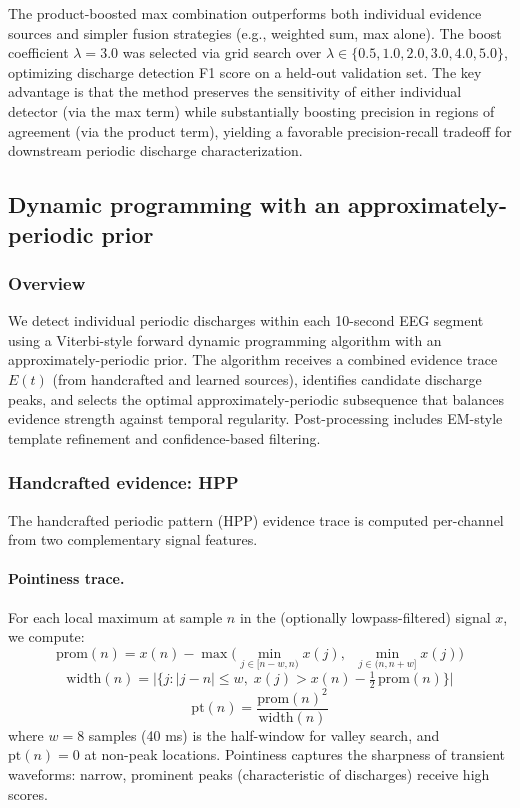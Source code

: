 The product-boosted max combination outperforms both individual evidence sources and simpler fusion strategies (e.g., weighted sum, max alone). The boost coefficient $\lambda = 3.0$ was selected via grid search over $\lambda \in \{0.5, 1.0, 2.0, 3.0, 4.0, 5.0\}$, optimizing discharge detection F1 score on a held-out validation set. The key advantage is that the method preserves the sensitivity of either individual detector (via the max term) while substantially boosting precision in regions of agreement (via the product term), yielding a favorable precision-recall tradeoff for downstream periodic discharge characterization.

\subsection{Dynamic programming with an approximately-periodic prior}
\label{app:dp}

\subsubsection{Overview}

We detect individual periodic discharges within each 10-second EEG segment using a Viterbi-style forward dynamic programming algorithm with an approximately-periodic prior. The algorithm receives a combined evidence trace $E(t)$ (from handcrafted and learned sources), identifies candidate discharge peaks, and selects the optimal approximately-periodic subsequence that balances evidence strength against temporal regularity. Post-processing includes EM-style template refinement and confidence-based filtering.

\subsubsection{Handcrafted evidence: HPP}

The handcrafted periodic pattern (HPP) evidence trace is computed per-channel from two complementary signal features.

\paragraph{Pointiness trace.}
For each local maximum at sample $n$ in the (optionally lowpass-filtered) signal $x$, we compute:
\[ \mathrm{prom}(n) = x(n) - \max\!\big(\min_{j \in [n-w, n)} x(j),\;\; \min_{j \in (n, n+w]} x(j)\big) \tag{1} \]
\[ \mathrm{width}(n) = \big|\{j : |j - n| \leq w,\; x(j) > x(n) - \tfrac{1}{2}\,\mathrm{prom}(n)\}\big| \tag{2} \]
\[ \mathrm{pt}(n) = \frac{\mathrm{prom}(n)^2}{\mathrm{width}(n)} \tag{3} \]
where $w = 8$ samples (40 ms) is the half-window for valley search, and $\mathrm{pt}(n) = 0$ at non-peak locations. Pointiness captures the sharpness of transient waveforms: narrow, prominent peaks (characteristic of discharges) receive high scores.

